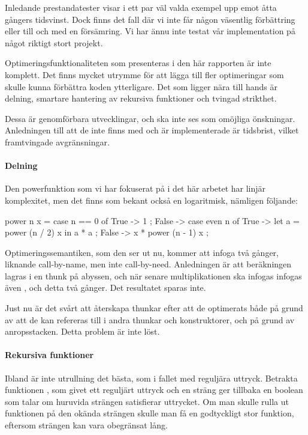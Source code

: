 \documentclass[Rapport]{subfiles}
\begin{document}
Inledande prestandatester visar i ett par väl valda exempel upp emot åtta gångers
tidsvinst. Dock finns det fall där vi inte får någon väsentlig förbättring eller
till och med en försämring. Vi har ännu inte testat vår implementation på något riktigt stort
projekt. 

Optimeringsfunktionaliteten som presenteras i den här rapporten är inte
komplett. Det finns mycket utrymme för att lägga till fler optimeringar
som skulle kunna förbättra koden ytterligare. Det som ligger nära till hands är
delning, smartare hantering av rekursiva funktioner och tvingad strikthet.

Dessa är genomförbara utvecklingar, och ska inte ses som omöjliga önskningar.
Anledningen till att de inte finns med och är implementerade är tidsbrist, vilket
framtvingade avgränsningar.

\paragraph{Delning}
Den powerfunktion som vi har fokuserat på i det här arbetet har linjär
komplexitet, men det finns som bekant också en logaritmisk, nämligen följande:

\begin{codeEx}
power n x = case n == 0 of
    { True  -> 1
    ; False -> case even n of
        { True  -> let a = power (n / 2) x 
                   in  a * a
        ; False -> x * power (n - 1) x
        }
    };
\end{codeEx}

Optimeringssemantiken, som den ser ut nu, kommer att infoga  två gånger,
liknande call-by-name, men inte call-by-need. Anledningen är att beräkningen
 lagras i en thunk på abyssen, och när senare multiplikationen ska
infogas infogas även , och detta två gånger. Det resultatet sparas
inte.

    Just nu är det svårt att återskapa thunkar efter att de optimerats både på grund
av att de kan refereras till i andra thunkar och konstruktorer, och på grund
av anropsstacken. Detta problem är inte löst.

\paragraph{Rekursiva funktioner}
\label{sec:future-regexp}
Ibland är inte utrullning det bästa, som i fallet med reguljära uttryck.
Betrakta funktionen , som givet
ett reguljärt uttryck och en sträng ger tillbaka en boolean som talar om huruvida strängen
satisfierar uttrycket. Om man skulle rulla ut funktionen på den okända strängen
skulle man få en godtyckligt stor funktion, eftersom strängen kan vara 
obegränsat lång.
\end{document}
